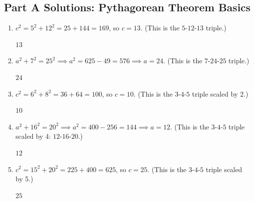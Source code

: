 \documentclass[14pt]{extarticle}
\begin{document}
\subsection*{Part A Solutions: Pythagorean Theorem Basics}
\begin{enumerate}
  \item \(c^2 = 5^2 + 12^2 = 25 + 144 = 169\), so \(c = 13\). (This is the \(5\text{-}12\text{-}13\) triple.)

  \(\boxed{13}\)

  \item \(a^2 + 7^2 = 25^2 \implies a^2 = 625 - 49 = 576 \implies a = 24\). (This is the \(7\text{-}24\text{-}25\) triple.)

  \(\boxed{24}\)

  \item \(c^2 = 6^2 + 8^2 = 36 + 64 = 100\), so \(c = 10\). (This is the \(3\text{-}4\text{-}5\) triple scaled by 2.)

  \(\boxed{10}\)

  \item \(a^2 + 16^2 = 20^2 \implies a^2 = 400 - 256 = 144 \implies a = 12\). (This is the \(3\text{-}4\text{-}5\) triple scaled by 4: \(12\text{-}16\text{-}20\).)

  \(\boxed{12}\)

  \item \(c^2 = 15^2 + 20^2 = 225 + 400 = 625\), so \(c = 25\). (This is the \(3\text{-}4\text{-}5\) triple scaled by 5.)

  \(\boxed{25}\)
\end{enumerate}
\end{document}
